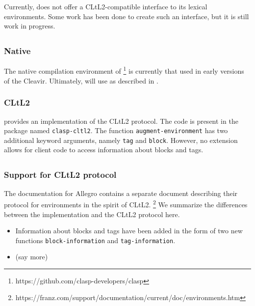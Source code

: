 Currently, \ecl{} does not offer a CLtL2-compatible interface to its
lexical environments.  Some work has been done to create such an
interface, but it is still work in progress.

\subsection{\clasp{}}

\subsubsection{Native}

The native compilation environment of \clasp{}%
\footnote{https://github.com/clasp-developers/clasp}
is currently that used in early versions of the Cleavir.  Ultimately,
\clasp{} will use \trucler{} as described in .

\subsubsection{CLtL2}

\clasp{} provides an implementation of the CLtL2 protocol.
The code is present in the package named \texttt{clasp-cltl2}.  The
function \texttt{augment-environment} has two additional keyword
arguments, namely \texttt{tag} and \texttt{block}.  However, no
extension allows for client code to access information about blocks
and tags.

\subsection{\allegro{}}
\label{sec-previous-allegro}

\subsubsection{Support for CLtL2 protocol}

The documentation for Allegro \commonlisp{} contains a separate
document describing their protocol for environments in the spirit of
CLtL2.%
\footnote{https://franz.com/support/documentation/current/doc/environments.htm}
We summarize the differences between the \allegro{} implementation and
the CLtL2 protocol here.

\begin{itemize}
\item Information about blocks and tags have been added in the form of
  two new functions \texttt{block-information} and
  \texttt{tag-information}.
\item (say more)
\end{itemize}

